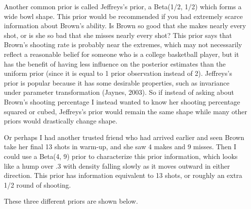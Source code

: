Another common prior is called Jeffreys's prior, a Beta(1/2, 1/2) which forms a wide bowl shape. This prior would be recommended if you had extremely scarce information about Brown's ability. Is Brown so good that she makes nearly every shot, or is she so bad that she misses nearly every shot? This prior says that Brown's shooting rate is probably near the extremes, which may not necessarily reflect a reasonable belief for someone who is a college basketball player, but it has the benefit of having less influence on the posterior estimates than the uniform prior (since it is equal to 1 prior observation instead of 2). Jeffreys's prior is popular because it has some desirable properties, such as invariance under parameter transformation (Jaynes, 2003). So if instead of asking about Brown's shooting percentage I instead wanted to know her shooting percentage squared or cubed, Jeffreys's prior would remain the same shape while many other priors would drastically change shape.

Or perhaps I had another trusted friend who had arrived earlier and seen Brown take her final 13 shots in warm-up, and she saw 4 makes and 9 misses. Then I could use a Beta(4, 9) prior to characterize this prior information, which looks like a hump over .3 with density falling slowly as it moves outward in either direction. This prior has information equivalent to 13 shots, or roughly an extra 1/2 round of shooting.

These three different priors are shown below.


